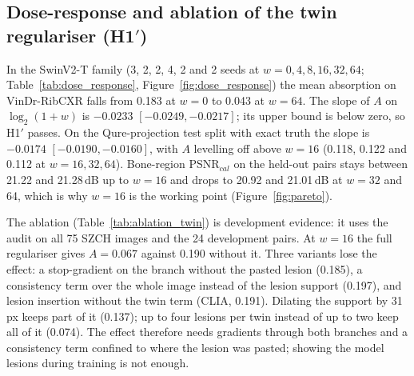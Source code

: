\subsection{Dose-response and ablation of the twin regulariser (\texorpdfstring{H1$'$}{H1'})}
\label{sec:res_twin}
In the SwinV2-T family (3, 2, 2, 4, 2 and 2 seeds at $w=0,4,8,16,32,64$; Table~\ref{tab:dose_response}, Figure~\ref{fig:dose_response}) the
mean absorption on VinDr-RibCXR falls from 0.183 at $w=0$ to 0.043 at $w=64$. The slope of $A$ on $\log_2(1+w)$ is $-0.0233$
$[-0.0249,-0.0217]$; its upper bound is below zero, so H1$'$ passes. On the Qure-projection test split with exact truth the slope is
$-0.0174$ $[-0.0190,-0.0160]$, with $A$ levelling off above $w=16$ (0.118, 0.122 and 0.112 at $w=16,32,64$). Bone-region PSNR$_{cal}$ on the
held-out pairs stays between 21.22 and 21.28\,dB up to $w=16$ and drops to 20.92 and 21.01\,dB at $w=32$ and 64, which is why $w=16$ is the
working point (Figure~\ref{fig:pareto}).

The ablation (Table~\ref{tab:ablation_twin}) is development evidence: it uses the audit on all 75 SZCH images and the 24 development pairs.
At $w=16$ the full regulariser gives $A=0.067$ against 0.190 without it. Three variants lose the effect: a stop-gradient on the branch without
the pasted lesion (0.185), a consistency term over the whole image instead of the lesion support (0.197), and lesion insertion without the twin
term (CLIA, 0.191). Dilating the support by 31\,px keeps part of it (0.137); up to four lesions per twin instead of up to two keep all of it (0.074).
The effect therefore needs gradients through both branches and a consistency term confined to where the lesion was pasted; showing the model
lesions during training is not enough.


